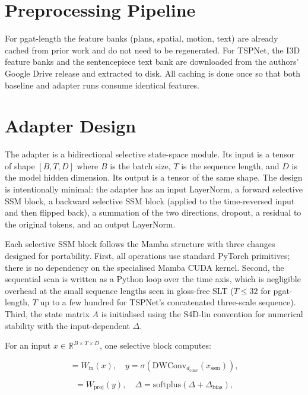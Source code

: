 \section{Preprocessing Pipeline}

For pgat-length the feature banks (plans, spatial, motion, text) are already cached from prior work and do not need to be regenerated. For TSPNet, the I3D feature banks and the sentencepiece text bank are downloaded from the authors' Google Drive release and extracted to disk. All caching is done once so that both baseline and adapter runs consume identical features.

\section{Adapter Design}

The adapter is a bidirectional selective state-space module. Its input is a tensor of shape $[B, T, D]$ where $B$ is the batch size, $T$ is the sequence length, and $D$ is the model hidden dimension. Its output is a tensor of the same shape. The design is intentionally minimal: the adapter has an input LayerNorm, a forward selective SSM block, a backward selective SSM block (applied to the time-reversed input and then flipped back), a summation of the two directions, dropout, a residual to the original tokens, and an output LayerNorm.

Each selective SSM block follows the Mamba structure \citep{gu2023mamba} with three changes designed for portability. First, all operations use standard PyTorch primitives; there is no dependency on the specialised Mamba CUDA kernel. Second, the sequential scan is written as a Python loop over the time axis, which is negligible overhead at the small sequence lengths seen in gloss-free SLT ($T \le 32$ for pgat-length, $T$ up to a few hundred for TSPNet's concatenated three-scale sequence). Third, the state matrix $A$ is initialised using the S4D-lin convention \citep{gu2022s4} for numerical stability with the input-dependent $\Delta$.

For an input $x \in \mathbb{R}^{B \times T \times D}$, one selective block computes:

\begin{equation}
[x_{\text{ssm}}, z] = W_{\text{in}}(x), \quad y = \sigma(\mathrm{DWConv}_{d_{\text{conv}}}(x_{\text{ssm}})),
\end{equation}

\begin{equation}
[\Delta, B, C] = W_{\text{proj}}(y), \quad \Delta = \mathrm{softplus}(\Delta + \Delta_{\text{bias}}),
\end{equation}

